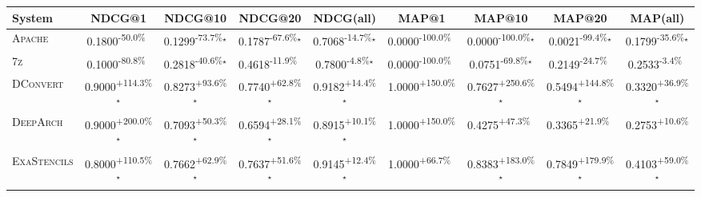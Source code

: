 \begin{table}[htbp]
\centering
\renewcommand{\arraystretch}{1.2}
\begin{tabular}{l|cccc|cccc}
\hline
System & NDCG@1 & NDCG@10 & NDCG@20 & NDCG(all) & MAP@1 & MAP@10 & MAP@20 & MAP(all) \\ \hline
\textsc{Apache} & \cellcolor{red!30}0.1800\textsuperscript{-50.0\%}$^{\,\,\,}$ & \cellcolor{red!30}0.1299\textsuperscript{-73.7\%}$^\star$ & \cellcolor{red!30}0.1787\textsuperscript{-67.6\%}$^\star$ & \cellcolor{red!30}0.7068\textsuperscript{-14.7\%}$^\star$ & \cellcolor{red!30}0.0000\textsuperscript{-100.0\%}$^{\,\,\,}$ & \cellcolor{red!30}0.0000\textsuperscript{-100.0\%}$^\star$ & \cellcolor{red!30}0.0021\textsuperscript{-99.4\%}$^\star$ & \cellcolor{red!30}0.1799\textsuperscript{-35.6\%}$^\star$ \\
\textsc{7z} & \cellcolor{red!30}0.1000\textsuperscript{-80.8\%}$^{\,\,\,}$ & \cellcolor{red!30}0.2818\textsuperscript{-40.6\%}$^\star$ & \cellcolor{red!30}0.4618\textsuperscript{-11.9\%}$^{\,\,\,}$ & \cellcolor{red!30}0.7800\textsuperscript{-4.8\%}$^\star$ & \cellcolor{red!30}0.0000\textsuperscript{-100.0\%}$^{\,\,\,}$ & \cellcolor{red!30}0.0751\textsuperscript{-69.8\%}$^\star$ & \cellcolor{red!30}0.2149\textsuperscript{-24.7\%}$^{\,\,\,}$ & \cellcolor{red!30}0.2533\textsuperscript{-3.4\%}$^{\,\,\,}$ \\
\textsc{DConvert} & \cellcolor{green!30}0.9000\textsuperscript{+114.3\%}$^\star$ & \cellcolor{green!30}0.8273\textsuperscript{+93.6\%}$^\star$ & \cellcolor{green!30}0.7740\textsuperscript{+62.8\%}$^\star$ & \cellcolor{green!30}0.9182\textsuperscript{+14.4\%}$^\star$ & \cellcolor{green!30}1.0000\textsuperscript{+150.0\%}$^{\,\,\,}$ & \cellcolor{green!30}0.7627\textsuperscript{+250.6\%}$^\star$ & \cellcolor{green!30}0.5494\textsuperscript{+144.8\%}$^\star$ & \cellcolor{green!30}0.3320\textsuperscript{+36.9\%}$^\star$ \\
\textsc{DeepArch} & \cellcolor{green!30}0.9000\textsuperscript{+200.0\%}$^\star$ & \cellcolor{green!30}0.7093\textsuperscript{+50.3\%}$^\star$ & \cellcolor{green!30}0.6594\textsuperscript{+28.1\%}$^\star$ & \cellcolor{green!30}0.8915\textsuperscript{+10.1\%}$^\star$ & \cellcolor{green!30}1.0000\textsuperscript{+150.0\%}$^{\,\,\,}$ & \cellcolor{green!30}0.4275\textsuperscript{+47.3\%}$^{\,\,\,}$ & \cellcolor{green!30}0.3365\textsuperscript{+21.9\%}$^{\,\,\,}$ & \cellcolor{green!30}0.2753\textsuperscript{+10.6\%}$^{\,\,\,}$ \\
\textsc{ExaStencils} & \cellcolor{green!30}0.8000\textsuperscript{+110.5\%}$^\star$ & \cellcolor{green!30}0.7662\textsuperscript{+62.9\%}$^\star$ & \cellcolor{green!30}0.7637\textsuperscript{+51.6\%}$^\star$ & \cellcolor{green!30}0.9145\textsuperscript{+12.4\%}$^\star$ & \cellcolor{green!30}1.0000\textsuperscript{+66.7\%}$^{\,\,\,}$ & \cellcolor{green!30}0.8383\textsuperscript{+183.0\%}$^\star$ & \cellcolor{green!30}0.7849\textsuperscript{+179.9\%}$^\star$ & \cellcolor{green!30}0.4103\textsuperscript{+59.0\%}$^\star$ \\

\end{tabular}
\end{table}
